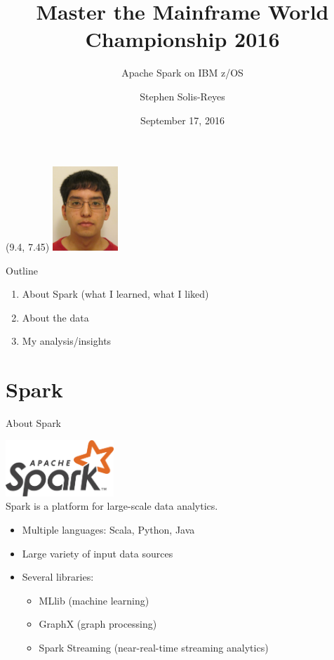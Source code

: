 \documentclass[xcolor=dvipsnames]{beamer}
\title{Master the Mainframe World Championship 2016}
\subtitle{Apache Spark on IBM z/OS}
\author{\hspace{\titledetailsskip}Stephen Solis-Reyes}
\institute{\hspace{\titledetailsskip}The University of Western Ontario \\\hspace{\titledetailsskip}London, Ontario, Canada}
\date{\hspace{\titledetailsskip}September 17, 2016}
\begin{document}
\begin{frame}
	\titlepage
	
	\begin{textblock}{0}(9.4, 7.45)
		\includegraphics[height=90pt]{picture}
	\end{textblock}
\end{frame}

\begin{frame}[t]{Outline}
	\vspace{4pt}
	\begin{enumerate}
		\setlength{\itemsep}{8pt}
		
		\item About Spark {\footnotesize (what I learned, what I liked)}
		\item About the data
		\item My analysis/insights
	\end{enumerate}
\end{frame}

\section{Spark}

\begin{frame}[t]{About Spark}
	\vspace{-2pt}
	\begin{center}
		\includegraphics[height=60pt]{spark-logo}\\[-2pt]
		Spark is a platform for large-scale data analytics.
	\end{center}
	
	\pause
	\vspace{-6pt}
	\begin{itemize}
		\item Multiple languages: Scala, Python, Java
		\item Large variety of input data sources
		\item Several libraries:
			\begin{itemize}
				\item MLlib (machine learning)
				\item GraphX (graph processing)
				\item Spark Streaming (near-real-time streaming analytics)
			\end{itemize}
	\end{itemize}
\end{frame}
\end{document}
